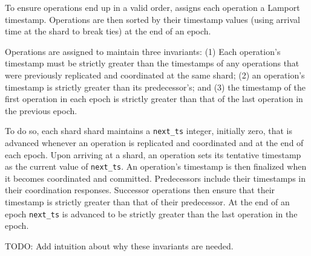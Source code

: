 
To ensure operations end up in a valid \MDL{} order, \sys{} assigns each operation a Lamport timestamp.
Operations are then sorted by their timestamp values (using arrival time at the shard to break ties)
at the end of an epoch.

Operations are assigned to maintain three invariants: (1) Each operation's timestamp must
be strictly greater than the timestamps of any operations that were previously replicated and coordinated
at the same shard; (2) an operation's timestamp is strictly greater than its predecessor's; and (3)
the timestamp of the first operation in each epoch is strictly greater than that of the last operation
in the previous epoch. 

To do so, each shard shard maintains a \texttt{next\_ts} integer, initially zero, that is advanced whenever
an operation is replicated and coordinated and at the end of each epoch. Upon arriving at a shard, an operation
sets its tentative timestamp as the current value of \texttt{next\_ts}. An operation's timestamp is then
finalized when it becomes coordinated and committed. Predecessors include their timestamps in their coordination
responses. Successor operations then ensure that their timestamp is strictly greater than that
of their predecessor. At the end of an epoch \texttt{next\_ts} is advanced to be strictly greater than the last
operation in the epoch.

TODO: Add intuition about why these invariants are needed.



